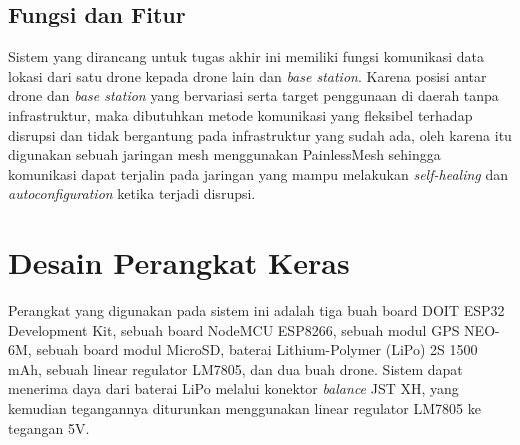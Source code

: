 \subsection{Fungsi dan Fitur}
Sistem yang dirancang untuk tugas akhir ini memiliki fungsi komunikasi data lokasi dari satu drone kepada drone lain dan \textit{base station}. Karena posisi antar drone dan \textit{base station} yang bervariasi serta target penggunaan di daerah tanpa infrastruktur, maka dibutuhkan metode komunikasi yang fleksibel terhadap disrupsi dan tidak bergantung pada infrastruktur yang sudah ada, oleh karena itu digunakan sebuah jaringan mesh menggunakan PainlessMesh sehingga komunikasi dapat terjalin pada jaringan yang mampu melakukan \textit{self-healing} dan \textit{autoconfiguration} ketika terjadi disrupsi.

\section{Desain Perangkat Keras}
Perangkat yang digunakan pada sistem ini adalah tiga buah board DOIT ESP32 Development Kit, sebuah board NodeMCU ESP8266, sebuah modul GPS NEO-6M, sebuah board modul MicroSD, baterai Lithium-Polymer (LiPo) 2S 1500 mAh, sebuah linear regulator LM7805, dan dua buah drone. Sistem dapat menerima daya dari baterai LiPo melalui konektor \textit{balance} JST XH, yang kemudian tegangannya diturunkan menggunakan linear regulator LM7805 ke tegangan 5V.


